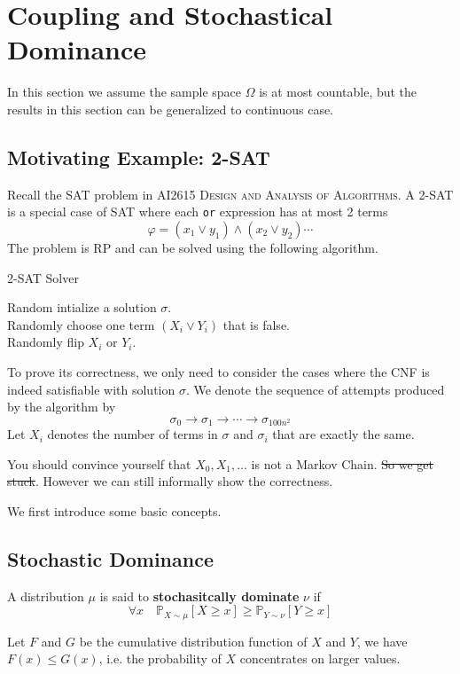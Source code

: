 \section{Coupling and Stochastical Dominance}
In this section we assume the sample space $\Omega$ is at most countable, but the results in this section can be generalized to continuous case.

    \subsection{Motivating Example: 2-SAT}
        Recall the SAT problem in \textsc{AI2615 Design and Analysis of Algorithms}. A 2-SAT is a special case of SAT where each \verb|or| expression has at most 2 terms
        \[ \varphi = (x_1 \vee y_1) \wedge (x_2 \vee y_2) \cdots \]
        The problem is RP and can be solved using the following algorithm.

        \begin{algorithm}
            \caption{2-SAT Solver}
            Random intialize a solution $\sigma$.\\
            {
                {
                    \KwRet{$\sigma$}
                }
                \Else
                {
                    Randomly choose one term $(X_i \vee Y_i)$ that is false.\\
                    Randomly flip $X_i$ or $Y_i$.
                }
            }
            \label{2SATAlgo}
        \end{algorithm}

        To prove its correctness, we only need to consider the cases where the CNF is indeed satisfiable with solution $\sigma$. We denote the sequence of attempts produced by the algorithm by
        \[ \sigma_0 \to \sigma_1 \to \cdots \to \sigma_{100n^2} \]
        Let $X_i$ denotes the number of terms in $\sigma$ and $\sigma_i$ that are exactly the same.

        You should convince yourself that $X_0, X_1, \dots$ is not a Markov Chain. \sout{So we get stuck}. However we can still informally show the correctness.

        We first introduce some basic concepts.

    \subsection{Stochastic Dominance}
        \begin{definition}
            A distribution $\mu$ is said to \textbf{stochasitcally dominate} $\nu$ if
            \[ \forall x\quad \mathbb{P}_{X\sim\mu}[X \ge x] \ge \mathbb{P}_{Y\sim\nu}[Y \ge x] \]
        \end{definition}
        \begin{remark}
            Let $F$ and $G$ be the cumulative distribution function of $X$ and $Y$, we have $F(x) \le G(x)$, i.e. the probability of $X$ concentrates on larger values.
        \end{remark}
